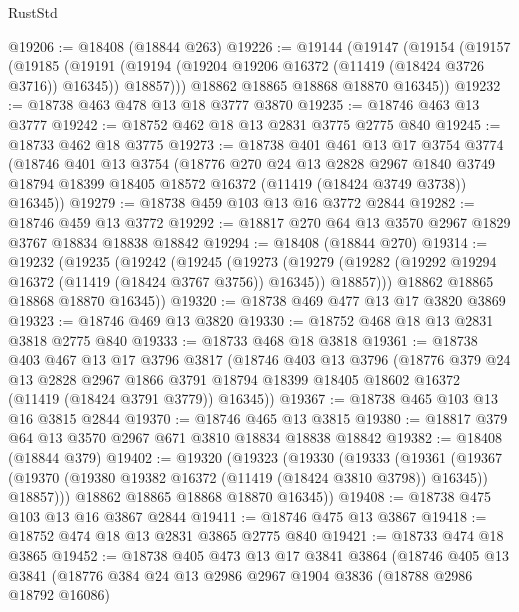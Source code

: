 \begin{lexlean}{RustStd}
\begin{coremodule}
@19206 := @18408 (@18844 @263)
@19226 := @19144
    (@19147
      (@19154
        (@19157
          (@19185
            (@19191 (@19194 (@19204 @19206 @16372 (@11419 (@18424 @3726 @3716)) @16345)) @18857)))
        @18862
        @18865
        @18868
        @18870
        @16345))
@19232 := @18738 @463 @478 @13 @18 @3777 @3870
@19235 := @18746 @463 @13 @3777
@19242 := @18752 @462 @18 @13 @2831 @3775 @2775 @840
@19245 := @18733 @462 @18 @3775
@19273 := @18738
    @401
    @461
    @13
    @17
    @3754
    @3774
    (@18746
      @401
      @13
      @3754
      (@18776
        @270
        @24
        @13
        @2828
        @2967
        @1840
        @3749
        @18794
        @18399
        @18405
        @18572
        @16372
        (@11419 (@18424 @3749 @3738))
        @16345))
@19279 := @18738 @459 @103 @13 @16 @3772 @2844
@19282 := @18746 @459 @13 @3772
@19292 := @18817 @270 @64 @13 @3570 @2967 @1829 @3767 @18834 @18838 @18842
@19294 := @18408 (@18844 @270)
@19314 := @19232
    (@19235
      (@19242
        (@19245
          (@19273
            (@19279 (@19282 (@19292 @19294 @16372 (@11419 (@18424 @3767 @3756)) @16345)) @18857)))
        @18862
        @18865
        @18868
        @18870
        @16345))
@19320 := @18738 @469 @477 @13 @17 @3820 @3869
@19323 := @18746 @469 @13 @3820
@19330 := @18752 @468 @18 @13 @2831 @3818 @2775 @840
@19333 := @18733 @468 @18 @3818
@19361 := @18738
    @403
    @467
    @13
    @17
    @3796
    @3817
    (@18746
      @403
      @13
      @3796
      (@18776
        @379
        @24
        @13
        @2828
        @2967
        @1866
        @3791
        @18794
        @18399
        @18405
        @18602
        @16372
        (@11419 (@18424 @3791 @3779))
        @16345))
@19367 := @18738 @465 @103 @13 @16 @3815 @2844
@19370 := @18746 @465 @13 @3815
@19380 := @18817 @379 @64 @13 @3570 @2967 @671 @3810 @18834 @18838 @18842
@19382 := @18408 (@18844 @379)
@19402 := @19320
    (@19323
      (@19330
        (@19333
          (@19361
            (@19367 (@19370 (@19380 @19382 @16372 (@11419 (@18424 @3810 @3798)) @16345)) @18857)))
        @18862
        @18865
        @18868
        @18870
        @16345))
@19408 := @18738 @475 @103 @13 @16 @3867 @2844
@19411 := @18746 @475 @13 @3867
@19418 := @18752 @474 @18 @13 @2831 @3865 @2775 @840
@19421 := @18733 @474 @18 @3865
@19452 := @18738
    @405
    @473
    @13
    @17
    @3841
    @3864
    (@18746
      @405
      @13
      @3841
      (@18776
        @384
        @24
        @13
        @2986
        @2967
        @1904
        @3836
        (@18788 @2986 @18792 @16086)

\end{coremodule}
\end{lexlean}
